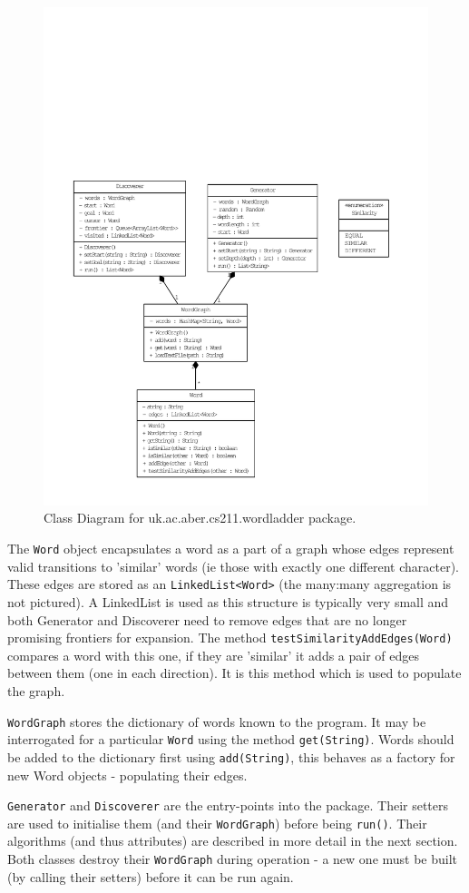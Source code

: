 \documentclass[11pt]{article} %
\begin{document}
\begin{figure}[h!]
\includegraphics[width=\textwidth]{ClassDiagram}
\caption{Class Diagram for uk.ac.aber.cs211.wordladder package.}
\end{figure}

The \texttt{Word} object encapsulates a word as a part of a graph whose edges represent valid transitions to 'similar' words (ie those with exactly one different character). These edges are stored as an \texttt{LinkedList<Word>} (the many:many aggregation is not pictured). A LinkedList is used as this structure is typically very small and both Generator and Discoverer need to remove edges that are no longer promising frontiers for expansion. The method \texttt{testSimilarityAddEdges(Word)} compares a word with this one, if they are 'similar' it adds a pair of edges between them (one in each direction). It is this method which is used to populate the graph.

\texttt{WordGraph} stores the dictionary of words known to the program. It may be interrogated for a particular \texttt{Word} using the method \texttt{get(String)}. Words should be added to the dictionary first using \texttt{add(String)}, this behaves as a factory for new Word objects - populating their edges.

\texttt{Generator} and \texttt{Discoverer} are the entry-points into the package. Their setters are used to initialise them (and their \texttt{WordGraph}) before being \texttt{run()}. Their algorithms (and thus attributes) are described in more detail in the next section. Both classes destroy their \texttt{WordGraph} during operation - a new one must be built (by calling their setters) before it can be run again.
\end{document}
